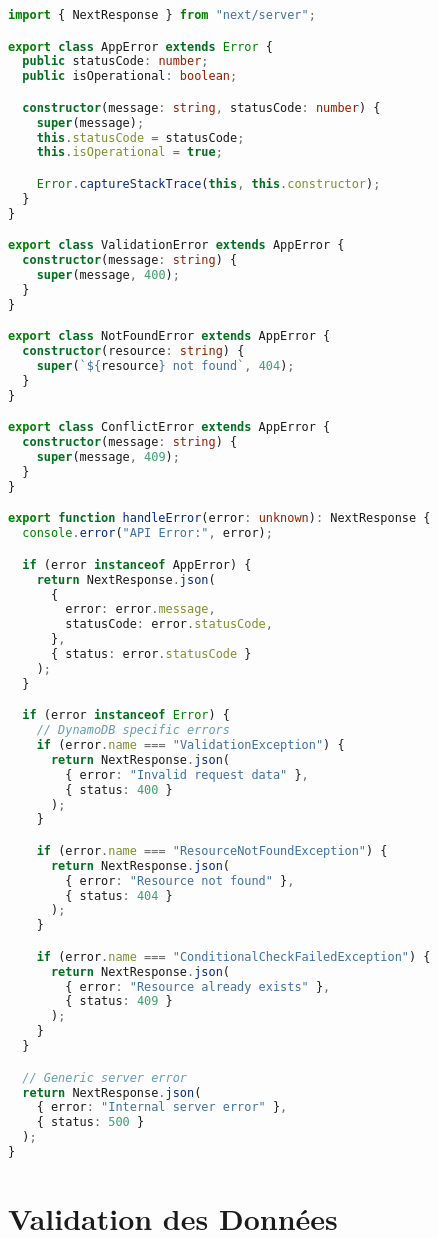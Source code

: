 \begin{lstlisting}[language=TypeScript, caption=Error Handling Middleware]
import { NextResponse } from "next/server";

export class AppError extends Error {
  public statusCode: number;
  public isOperational: boolean;

  constructor(message: string, statusCode: number) {
    super(message);
    this.statusCode = statusCode;
    this.isOperational = true;

    Error.captureStackTrace(this, this.constructor);
  }
}

export class ValidationError extends AppError {
  constructor(message: string) {
    super(message, 400);
  }
}

export class NotFoundError extends AppError {
  constructor(resource: string) {
    super(`${resource} not found`, 404);
  }
}

export class ConflictError extends AppError {
  constructor(message: string) {
    super(message, 409);
  }
}

export function handleError(error: unknown): NextResponse {
  console.error("API Error:", error);

  if (error instanceof AppError) {
    return NextResponse.json(
      {
        error: error.message,
        statusCode: error.statusCode,
      },
      { status: error.statusCode }
    );
  }

  if (error instanceof Error) {
    // DynamoDB specific errors
    if (error.name === "ValidationException") {
      return NextResponse.json(
        { error: "Invalid request data" },
        { status: 400 }
      );
    }

    if (error.name === "ResourceNotFoundException") {
      return NextResponse.json(
        { error: "Resource not found" },
        { status: 404 }
      );
    }

    if (error.name === "ConditionalCheckFailedException") {
      return NextResponse.json(
        { error: "Resource already exists" },
        { status: 409 }
      );
    }
  }

  // Generic server error
  return NextResponse.json(
    { error: "Internal server error" },
    { status: 500 }
  );
}
\end{lstlisting}

\section{Validation des Données}


